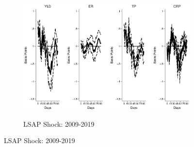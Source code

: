 \documentclass{article}
\begin{document}
\begin{figure}[tbph]
	\begin{subfigure}[t]{\textwidth}
		\begin{center}
			\includegraphics[trim={0cm 0cm 0cm 0cm},clip,height=0.26\textheight,width=1\textwidth]{../Figures/LPs/LagDep-FX/LSAP/AE/LSAPAEnomyptpphi120m.eps} \\
			\caption{LSAP Shock: 2009-2019} \label{subfig:LPAE10Ylsap}
		\end{center}
	\end{subfigure}
	
\end{figure}
\end{document}
